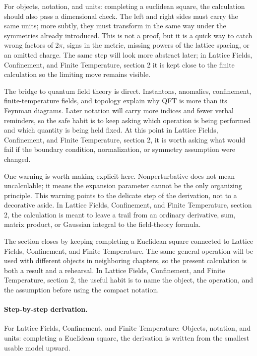 For objects, notation, and units: completing a euclidean square, the calculation should also pass a dimensional check.  The left and right sides must carry the same units; more subtly, they must transform in the same way under the symmetries already introduced.  This is not a proof, but it is a quick way to catch wrong factors of \(2\pi\), signs in the metric, missing powers of the lattice spacing, or an omitted charge.  The same step will look more abstract later; in Lattice Fields, Confinement, and Finite Temperature, section 2 it is kept close to the finite calculation so the limiting move remains visible.

The bridge to quantum field theory is direct.  Instantons, anomalies, confinement, finite-temperature fields, and topology explain why QFT is more than its Feynman diagrams.  Later notation will carry more indices and fewer verbal reminders, so the safe habit is to keep asking which operation is being performed and which quantity is being held fixed.  At this point in Lattice Fields, Confinement, and Finite Temperature, section 2, it is worth asking what would fail if the boundary condition, normalization, or symmetry assumption were changed.

One warning is worth making explicit here.  Nonperturbative does not mean uncalculable; it means the expansion parameter cannot be the only organizing principle.  This warning points to the delicate step of the derivation, not to a decorative aside.  In Lattice Fields, Confinement, and Finite Temperature, section 2, the calculation is meant to leave a trail from an ordinary derivative, sum, matrix product, or Gaussian integral to the field-theory formula.

The section closes by keeping completing a Euclidean square connected to Lattice Fields, Confinement, and Finite Temperature.  The same general operation will be used with different objects in neighboring chapters, so the present calculation is both a result and a rehearsal.  In Lattice Fields, Confinement, and Finite Temperature, section 2, the useful habit is to name the object, the operation, and the assumption before using the compact notation.



\paragraph{Step-by-step derivation.}

For Lattice Fields, Confinement, and Finite Temperature: Objects, notation, and units: completing a Euclidean square, the derivation is written from the smallest usable model upward.

